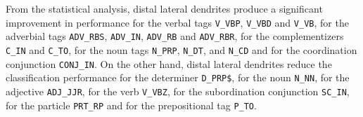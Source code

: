 {From the statistical analysis, distal lateral dendrites produce a significant improvement in performance for the verbal tags
\texttt{V\_VBP}, \texttt{V\_VBD} and \texttt{V\_VB}, for the adverbial tags \texttt{ADV\_RBS}, \texttt{ADV\_IN}, \texttt{ADV\_RB} and \texttt{ADV\_RBR}, for the complementizers  \texttt{C\_IN} and \texttt{C\_TO}, for the noun tags \texttt{N\_PRP}, \texttt{N\_DT}, and \texttt{N\_CD} and for the coordination conjunction \texttt{CONJ\_IN}.
On the other hand, distal lateral dendrites reduce the classification performance for the determiner
\texttt{D\_PRP\$}, for the noun \texttt{N\_NN}, for the adjective \texttt{ADJ\_JJR}, for the verb \texttt{V\_VBZ}, for the subordination conjunction \texttt{SC\_IN}, for the particle \texttt{PRT\_RP} and for the prepositional tag \texttt{P\_TO}.
}



































